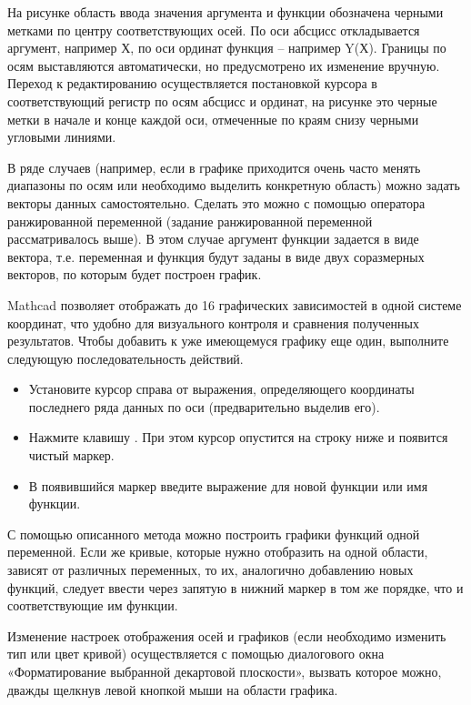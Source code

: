 На рисунке область ввода значения аргумента и функции обозначена черными метками по центру соответствующих осей. По оси абсцисс откладывается аргумент, например Х, по оси ординат функция – например Y(Х). Границы по осям выставляются автоматически, но предусмотрено их изменение вручную. Переход к редактированию осуществляется постановкой курсора в соответствующий регистр по осям абсцисс и ординат, на рисунке это черные метки в начале и конце каждой оси, отмеченные по краям снизу черными угловыми линиями.

В ряде случаев (например, если в графике приходится очень часто менять диапазоны по осям или необходимо выделить конкретную область) можно задать векторы данных самостоятельно. Сделать это можно с помощью оператора ранжированной переменной (задание ранжированной переменной рассматривалось выше). В этом случае аргумент функции задается в виде вектора, т.е. переменная и функция будут заданы в виде двух соразмерных векторов, по которым будет построен график.

Mathcad позволяет отображать до 16 графических зависимостей в одной системе координат, что удобно для визуального контроля и сравнения полученных результатов. Чтобы добавить к уже имеющемуся графику еще один, выполните следующую последовательность действий.
\begin{itemize}
	\item Установите курсор справа от выражения, определяющего координаты последнего ряда данных по оси  (предварительно выделив его).
	\item Нажмите клавишу \keys{,}. При этом курсор опустится на строку ниже и появится чистый маркер.
	\item В появившийся маркер введите выражение для новой функции или имя функции.
\end{itemize}

С помощью описанного метода можно построить графики функций одной переменной. Если же кривые, которые нужно отобразить на одной области, зависят от различных переменных, то их, аналогично добавлению новых функций, следует ввести через запятую в нижний маркер в том же порядке, что и соответствующие им функции.

Изменение настроек отображения осей и графиков (если необходимо изменить тип или цвет кривой) осуществляется с помощью диалогового окна «Форматирование выбранной декартовой плоскости», вызвать которое можно, дважды щелкнув левой кнопкой мыши на области графика.





